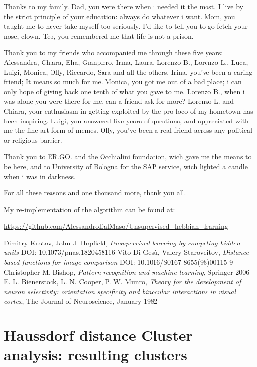 \documentclass[a4paper]{report}
\begin{document}
Thanks to my family. Dad, you were there when i needed it the most. I live by the strict principle of your education: always do whatever i want. Mom, you taught me to never take myself too seriously. I'd like to tell you to go fetch your nose, clown. Teo, you remembered me that life is not a prison.

Thank you to my friends who accompanied me through these five years: Alessandra, Chiara, Elia, Gianpiero, Irina, Laura, Lorenzo B., Lorenzo L., Luca, Luigi, Monica, Olly, Riccardo, Sara and all the others. Irina, you've been a caring friend; It means so much for me. Monica, you got me out of a bad place; i can only hope of giving back one tenth of what you gave to me. Lorenzo B., when i was alone you were there for me, can a friend ask for more? Lorenzo L. and Chiara, your enthusiasm in getting exploited by the pro loco of my hometown has been inspiring. Luigi, you answered five years of questions, and appreciated with me the fine art form of memes. Olly, you've been a real friend across any political or religious barrier.

Thank you to ER.GO. and the Occhialini foundation, wich gave me the means to be here, and to University of Bologna for the SAP service, wich lighted a candle when i was in darkness.

For all these reasons and one thousand more, thank you all.
\begin{thebibliography}{9}
My re-implementation of the algorithm can be found at:

\url{https://github.com/AlessandroDalMaso/Unsupervised\_hebbian\_learning}

Dimitry Krotov, John J. Hopfield, \textit{Unsupervised learning by competing hidden units}
DOI: 10.1073/pnas.1820458116
Vito Di Gesù, Valery Starovoitov, \textit{Distance-based functions for image comparison}
DOI: 10.1016/S0167-8655(98)00115-9
Christopher M. Bishop, \textit{Pattern recognition and machine learning}, Springer 2006
E. L. Bienerstock, L. N. Cooper, P. W. Munro, \textit{Theory for the development of neuron selectivity: orientation specificity and binocular interactions in visual cortex}, The Journal of Neuroscience, January 1982
\end{thebibliography}

\appendix

\chapter{Haussdorf distance Cluster analysis: resulting clusters}
\end{document}

